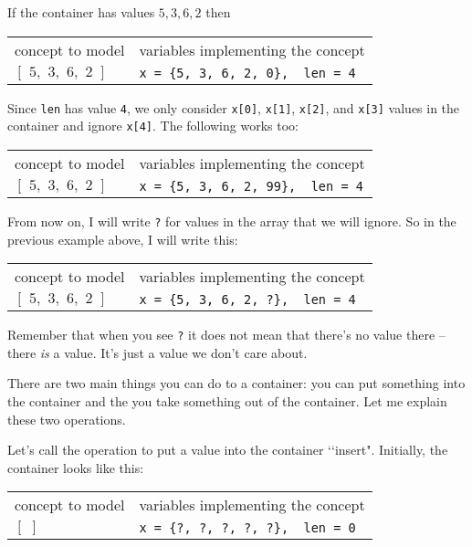 If the
container has values $5, 3, 6, 2$ then

\begin{longtable}{ll} 
concept to model & \hspace{3 cm}variables implementing the concept \\
$[\,\,5,\,\,3,\,\,6,\,\,2\,\,]$ & \hspace{3 cm}\verb!x = {5, 3, 6, 2, 0},  len = 4!
\end{longtable}

Since \verb!len! has value \verb!4!, we only consider
\verb!x[0]!,
\verb!x[1]!,
\verb!x[2]!, and
\verb!x[3]! values in the container and
ignore \verb!x[4]!.
The following works too:

\begin{longtable}{ll} 
concept to model & \hspace{3 cm}variables implementing the concept \\
$[\,\,5,\,\,3,\,\,6,\,\,2\,\,]$ & \hspace{3 cm}\verb!x = {5, 3, 6, 2, 99},  len = 4!
\end{longtable}

From now on, I will write \verb!?! for values in the array that
we will ignore.
So in the previous example above, I will write this:

\begin{longtable}{ll} 
concept to model & \hspace{3 cm}variables implementing the concept \\
$[\,\,5,\,\,3,\,\,6,\,\,2\,\,]$ & \hspace{3 cm}\verb!x = {5, 3, 6, 2, ?},  len = 4!
\end{longtable}

Remember that when you see \verb!?! it does not mean that there's no
value there -- there \textit{is} a value.
It's just a value we don't care about.

There are two main things you can do to a container:
you can put something into the container and the you
take something out of the container.
Let me explain these two operations.

Let's call the operation to put a value into the container \lq\lq insert".
Initially, the container looks like this:

\begin{longtable}{ll}
concept to model & \hspace{3 cm}variables implementing the concept \\
$[\,\,]$ & \hspace{3 cm}\verb!x = {?, ?, ?, ?, ?},  len = 0!
\end{longtable}

